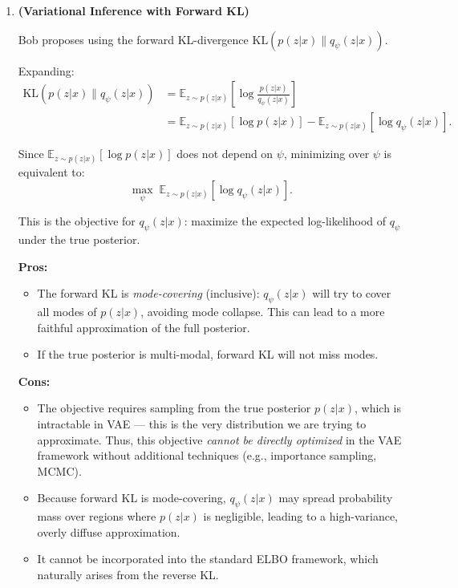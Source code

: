\documentclass{article}
\begin{document}
{\begin{enumerate}
        \item \textbf{(Variational Inference with Forward KL)}

        Bob proposes using the forward KL-divergence $\mathrm{KL}(p(z|x) \| q_\psi(z|x))$.

        Expanding:
        \begin{align}
        \mathrm{KL}(p(z|x) \| q_\psi(z|x))
        &= \mathbb{E}_{z \sim p(z|x)}\left[\log \frac{p(z|x)}{q_\psi(z|x)}\right] \nonumber \\
        &= \mathbb{E}_{z \sim p(z|x)}[\log p(z|x)] - \mathbb{E}_{z \sim p(z|x)}[\log q_\psi(z|x)]. \nonumber
        \end{align}

        Since $\mathbb{E}_{z \sim p(z|x)}[\log p(z|x)]$ does not depend on $\psi$, minimizing over $\psi$ is equivalent to:
        \[
        \max_\psi \; \mathbb{E}_{z \sim p(z|x)}[\log q_\psi(z|x)].
        \]

        This is the objective for $q_\psi(z|x)$: maximize the expected log-likelihood of $q_\psi$ under the true posterior.

        \textbf{Pros:}
        \begin{itemize}
            \item The forward KL is \emph{mode-covering} (inclusive): $q_\psi(z|x)$ will try to cover all modes of $p(z|x)$, avoiding mode collapse. This can lead to a more faithful approximation of the full posterior.
            \item If the true posterior is multi-modal, forward KL will not miss modes.
        \end{itemize}

        \textbf{Cons:}
        \begin{itemize}
            \item The objective requires sampling from the true posterior $p(z|x)$, which is intractable in VAE --- this is the very distribution we are trying to approximate. Thus, this objective \emph{cannot be directly optimized} in the VAE framework without additional techniques (e.g., importance sampling, MCMC).
            \item Because forward KL is mode-covering, $q_\psi(z|x)$ may spread probability mass over regions where $p(z|x)$ is negligible, leading to a high-variance, overly diffuse approximation.
            \item It cannot be incorporated into the standard ELBO framework, which naturally arises from the reverse KL.
        \end{itemize}
    \end{enumerate}
}
\end{document}
